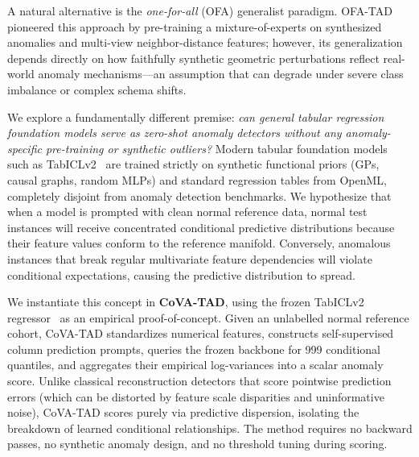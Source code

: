 \documentclass{article}
\begin{document}
A natural alternative is the \emph{one-for-all} (OFA) generalist paradigm. OFA-TAD~\citep{li2026towards} pioneered this approach by pre-training a mixture-of-experts on synthesized anomalies and multi-view neighbor-distance features; however, its generalization depends directly on how faithfully synthetic geometric perturbations reflect real-world anomaly mechanisms---an assumption that can degrade under severe class imbalance or complex schema shifts.

We explore a fundamentally different premise: \emph{can general tabular regression foundation models serve as zero-shot anomaly detectors without any anomaly-specific pre-training or synthetic outliers?} Modern tabular foundation models such as TabICLv2~\citep{qu2026tabiclv2} are trained strictly on synthetic functional priors (GPs, causal graphs, random MLPs) and standard regression tables from OpenML, completely disjoint from anomaly detection benchmarks. We hypothesize that when a model is prompted with clean normal reference data, normal test instances will receive concentrated conditional predictive distributions because their feature values conform to the reference manifold. Conversely, anomalous instances that break regular multivariate feature dependencies will violate conditional expectations, causing the predictive distribution to spread.

We instantiate this concept in \textbf{CoVA-TAD}, using the frozen TabICLv2 regressor~\citep{qu2026tabiclv2} as an empirical proof-of-concept. Given an unlabelled normal reference cohort, CoVA-TAD standardizes numerical features, constructs self-supervised column prediction prompts, queries the frozen backbone for 999 conditional quantiles, and aggregates their empirical log-variances into a scalar anomaly score. Unlike classical reconstruction detectors that score pointwise prediction errors (which can be distorted by feature scale disparities and uninformative noise), CoVA-TAD scores purely via predictive dispersion, isolating the breakdown of learned conditional relationships. The method requires no backward passes, no synthetic anomaly design, and no threshold tuning during scoring.
\end{document}
